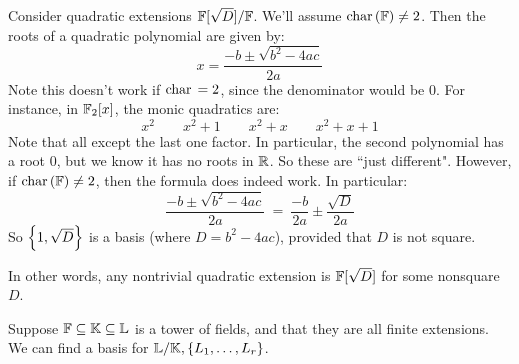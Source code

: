 \begin{xmp}[source=Primary Source Material]
    Consider quadratic extensions $ \mathbb{F}[\sqrt{D}]/\mathbb{F} $.
    We'll assume $ \operatorname{char\,}(\mathbb{F}) \neq 2 $. \vsp
    Then the roots of a quadratic polynomial are given by:
    \begin{equation*}
        x = \frac{-b \pm \sqrt{b^{2}-4ac}}{2a}
    \end{equation*}
    Note this doesn't work if $ \operatorname{char\,} = 2 $, since the denominator would be 0.
    \vsp
    For instance, in $ \mathbb{F}_{2}[x] $, the monic quadratics are:
    \begin{equation*}
        x^{2} \qquad x^{2}+1 \qquad x^{2}+x \qquad x^{2}+x+1
    \end{equation*}
    Note that all except the last one factor. In particular, the second
    polynomial has a root $ 0 $, but we know it has no roots in $ \mathbb{R} $.
    So these are ``just different". \vsp
    However, if $ \operatorname{char\,}(\mathbb{F}) \neq 2 $, then the formula does indeed work.
    In particular:
    \begin{equation*}
        \frac{-b \pm \sqrt{b^{2}-4ac}}{2a} \ = \ \frac{-b}{2a} \pm
        \frac{\sqrt{D}}{2a}
    \end{equation*}
    So $ \left\{{1, \sqrt{D}}\right\} $ is a basis (where $ D = b^{2}-4ac $), provided that
    $ D $ is not square.
\end{xmp}
In other words, any nontrivial quadratic extension is $ \mathbb{F}[\sqrt{D}] $ for
some nonsquare $ D $.

Suppose $ \mathbb{F} \subseteq \mathbb{K} \subseteq \mathbb{L} $ is a tower of fields, and
that they are all finite extensions. We can find a basis for $ \mathbb{L}/\mathbb{K},
\left\{{L_{1}, \dots, L_{r}}\right\} $.

